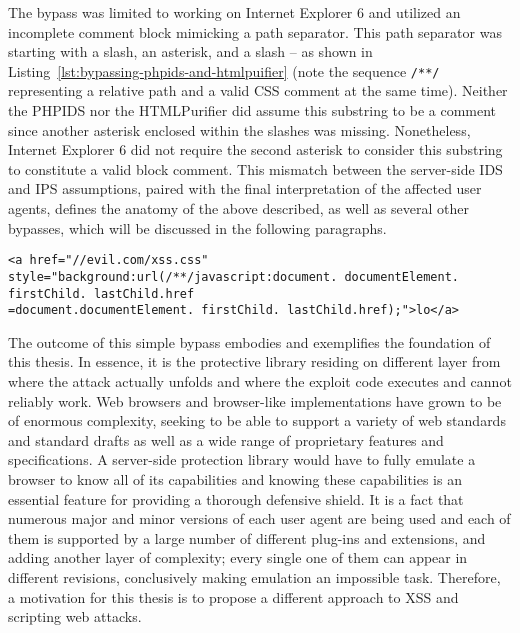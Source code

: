   The bypass was limited to working on Internet Explorer 6 and utilized an incomplete comment block mimicking a path separator. This path separator was starting with a slash, an asterisk, and a slash -- as shown in Listing~\ref{lst:bypassing-phpids-and-htmlpuifier} (note the sequence \texttt{/**/} representing a relative path and a valid CSS comment at the same time). Neither the PHPIDS nor the HTMLPurifier did assume this substring to be a comment since another asterisk enclosed within the slashes was missing. Nonetheless, Internet Explorer 6  did not require the second asterisk to consider this substring to constitute a valid block comment. This mismatch between the server-side IDS and IPS assumptions, paired with the final interpretation of the affected user agents, defines the anatomy of the above described, as well as several other bypasses, which will be discussed in the following paragraphs. 

\begin{lstlisting}[label=lst:bypassing-phpids-and-htmlpuifier,caption=Example-bypass for PHPIDS; Ambiguities between path separators and comments are being used to bypass the filter rules,captionpos=b]
<a href="//evil.com/xss.css" style="background:url(/**/javascript:document. documentElement. firstChild. lastChild.href
=document.documentElement. firstChild. lastChild.href);">lo</a>
\end{lstlisting}

  The outcome of this simple bypass embodies and exemplifies the foundation of this thesis. In essence, it is the protective library residing on different layer from where the attack actually unfolds and where the exploit code executes and cannot reliably work. Web browsers and browser-like implementations have grown to be of enormous complexity, seeking to be able to support a variety of web standards and standard drafts as well as a wide range of proprietary features and specifications. A server-side protection library would have to fully emulate a browser to know all of its capabilities and knowing these capabilities is an essential feature for providing a thorough defensive shield. It is a fact that numerous major and minor versions of each user agent are being used and each of them is supported by a large number of different plug-ins and extensions, and adding another layer of complexity; every single one of them can appear in different revisions, conclusively making emulation an impossible task. 
Therefore, a motivation for this thesis is to propose a different approach to XSS and scripting web attacks.

